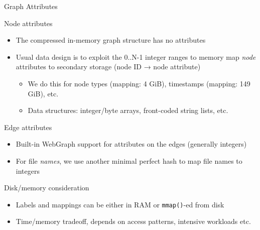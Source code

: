 \documentclass[aspectratio=169,xcolor=table]{beamer}
\begin{document}
    \begin{frame}{Graph Attributes}
        \begin{block}{Node attributes}
            \begin{itemize}
                \item The compressed in-memory graph structure has \alert{no attributes}
                \item Usual data design is to exploit the 0..N-1 integer ranges to \alert{memory map
                    \emph{node} attributes} to secondary storage (node ID →
                    node attribute)
                    \begin{itemize}
                        \item We do this for node types (mapping: 4 GiB),
                            timestamps (mapping: 149 GiB), etc.
                        \item Data structures: integer/byte arrays, front-coded
                            string lists, etc.
                    \end{itemize}
            \end{itemize}
        \end{block}
        \begin{block}{Edge attributes}
            \begin{itemize}
                \item Built-in WebGraph support for attributes on the \alert{edges} (generally integers)
                \item For file \emph{names}, we use another minimal perfect hash to map file names to integers
            \end{itemize}
        \end{block}
        \begin{block}{Disk/memory consideration}
            \begin{itemize}
                \item Labels and mappings can be either in RAM or
                    \texttt{mmap()}-ed from disk
                \item Time/memory tradeoff, depends on access patterns, intensive
                    workloads etc.
            \end{itemize}
        \end{block}
    \end{frame}
\end{document}
